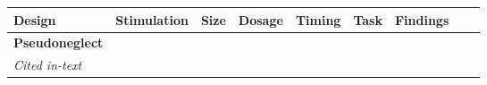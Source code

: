 \documentclass[11pt,english,]{memoir}
\begin{document}
\begin{longtable}[]{@{}lllllllll@{}}
\begin{minipage}[b]{0.04\columnwidth}
Design\strut
\end{minipage} & \begin{minipage}[b]{0.10\columnwidth}\raggedright
Stimulation\strut
\end{minipage} & \begin{minipage}[b]{0.04\columnwidth}\raggedright
Size\strut
\end{minipage} & \begin{minipage}[b]{0.04\columnwidth}\raggedright
Dosage\strut
\end{minipage} & \begin{minipage}[b]{0.04\columnwidth}\raggedright
Timing\strut
\end{minipage} & \begin{minipage}[b]{0.10\columnwidth}\raggedright
Task\strut
\end{minipage} & \begin{minipage}[b]{0.28\columnwidth}\raggedright
Findings\strut
\end{minipage}\tabularnewline
\midrule
\endhead
\begin{minipage}[t]{0.09\columnwidth}\raggedright
\textbf{Pseudoneglect}\strut
\end{minipage} & \begin{minipage}[t]{0.02\columnwidth}\raggedright
\strut
\end{minipage} & \begin{minipage}[t]{0.04\columnwidth}\raggedright
\strut
\end{minipage} & \begin{minipage}[t]{0.10\columnwidth}\raggedright
\strut
\end{minipage} & \begin{minipage}[t]{0.04\columnwidth}\raggedright
\strut
\end{minipage} & \begin{minipage}[t]{0.04\columnwidth}\raggedright
\strut
\end{minipage} & \begin{minipage}[t]{0.04\columnwidth}\raggedright
\strut
\end{minipage} & \begin{minipage}[t]{0.10\columnwidth}\raggedright
\strut
\end{minipage} & \begin{minipage}[t]{0.28\columnwidth}\raggedright
\strut
\end{minipage}\tabularnewline
\begin{minipage}[t]{0.09\columnwidth}\raggedright
\emph{Cited in-text}\strut

\end{minipage}
\end{longtable}
\end{document}
